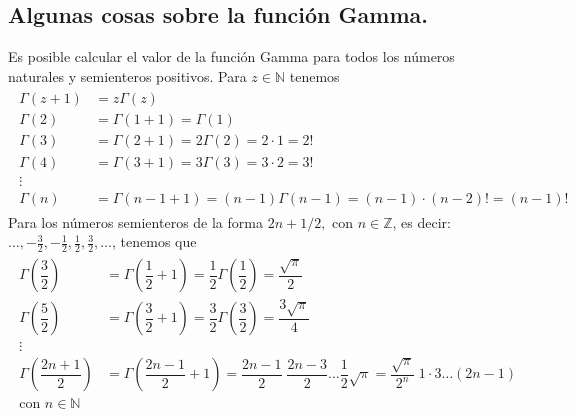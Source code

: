 \subsection{Algunas cosas sobre la función Gamma.}
Es posible calcular el valor de la función Gamma para todos los números naturales y semienteros positivos. Para $z \in \mathbb{N}$ tenemos
\begin{eqnarray}
\begin{aligned}
\Gamma (z+1) &= z \Gamma (z) \\
\Gamma (2) &= \Gamma (1+1) = \Gamma (1) \\
\Gamma (3) &= \Gamma (2+1) = 2 \Gamma (2)= 2 \cdot 1 = 2! \\
\Gamma (4) &= \Gamma (3+1) = 3 \Gamma (3)= 3 \cdot 2 = 3! \\
\vdots \\
\Gamma (n) &= \Gamma (n-1+1) = (n-1) \Gamma (n-1)= (n - 1) \cdot (n - 2)! = (n-1)!
\end{aligned}
\end{eqnarray}
Para los números semienteros de la forma $2n+1/2, \mbox{ con } n \in \mathbb{Z}$, es decir: $\ldots, -\frac{3}{2}, - \frac{1}{2}, \frac{1}{2}, \frac{3}{2}, \ldots$, tenemos que
\begin{eqnarray}
\begin{aligned}
\Gamma \left( \dfrac{3}{2} \right) &= \Gamma \left( \dfrac{1}{2} + 1 \right) = \dfrac{1}{2} \Gamma \left( \dfrac{1}{2} \right) = \dfrac{\sqrt{\pi}}{2} \\
\Gamma \left( \dfrac{5}{2} \right) &= \Gamma \left( \dfrac{3}{2} + 1 \right) = \dfrac{3}{2} \Gamma \left( \dfrac{3}{2} \right) = \dfrac{3 \sqrt{\pi}}{4} \\
\vdots \\
\Gamma \left( \dfrac{2n + 1}{2} \right) &= \Gamma \left( \dfrac{2n - 1}{2} + 1 \right) = \dfrac{2n - 1}{2} \; \dfrac{2n - 3}{2} \ldots \dfrac{1}{2} \sqrt{\pi} = \dfrac{\sqrt{\pi}}{2^{n}} \; 1 \cdot 3 \ldots (2n-1) \\
\mbox{con } n \in \mathbb{N}
\end{aligned}
\end{eqnarray}
